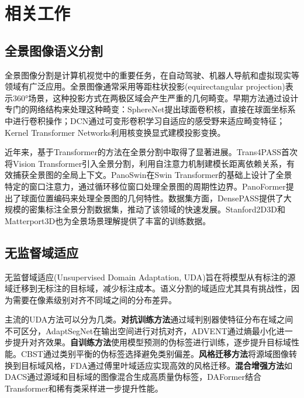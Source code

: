 \section{相关工作}

\subsection{全景图像语义分割}

全景图像分割是计算机视觉中的重要任务，在自动驾驶、机器人导航和虚拟现实等领域有广泛应用。全景图像通常采用等距柱状投影(equirectangular projection)表示360°场景，这种投影方式在两极区域会产生严重的几何畸变\cite{su2017learning,coors2018spherenet}。早期方法通过设计专门的网络结构来处理这种畸变：SphereNet\cite{coors2018spherenet}提出球面卷积核，直接在球面坐标系中进行卷积操作；DCN\cite{dai2017deformable}通过可变形卷积学习自适应的感受野来适应畸变特征；Kernel Transformer Networks\cite{su2019kernel}利用核变换显式建模投影变换。

近年来，基于Transformer的方法在全景分割中取得了显著进展。Trans4PASS\cite{zhang2022trans4pass}首次将Vision Transformer引入全景分割，利用自注意力机制建模长距离依赖关系，有效捕获全景图的全局上下文。PanoSwin\cite{yang2023panoswin}在Swin Transformer的基础上设计了全景特定的窗口注意力，通过循环移位窗口处理全景图的周期性边界。PanoFormer\cite{zhang2021panomer}提出了球面位置编码来处理全景图的几何特性。数据集方面，DensePASS\cite{ma2021densepass}提供了大规模的密集标注全景分割数据集，推动了该领域的快速发展。Stanford2D3D\cite{armeni20163d}和Matterport3D\cite{chang2017matterport3d}也为全景场景理解提供了丰富的训练数据。

\subsection{无监督域适应}

无监督域适应(Unsupervised Domain Adaptation, UDA)旨在将模型从有标注的源域迁移到无标注的目标域，减少标注成本。语义分割的域适应尤其具有挑战性，因为需要在像素级别对齐不同域之间的分布差异\cite{hoffman2018cycada,zhang2017curriculum}。

主流的UDA方法可以分为几类。\textbf{对抗训练方法}\cite{tsai2018learning,vu2019advent}通过域判别器使特征分布在域之间不可区分，AdaptSegNet\cite{tsai2018learning}在输出空间进行对抗对齐，ADVENT\cite{vu2019advent}通过熵最小化进一步提升对齐效果。\textbf{自训练方法}\cite{zou2018unsupervised,zou2019confidence}使用模型预测的伪标签进行训练，逐步提升目标域性能。CBST\cite{zou2019confidence}通过类别平衡的伪标签选择避免类别偏差。\textbf{风格迁移方法}\cite{hoffman2018cycada,yang2020fda}将源域图像转换到目标域风格，FDA\cite{yang2020fda}通过傅里叶域适应实现高效的风格迁移。\textbf{混合增强方法}\cite{tranheden2021dacs,hoyer2022daformer}如DACS\cite{tranheden2021dacs}通过源域和目标域的图像混合生成高质量伪标签，DAFormer\cite{hoyer2022daformer}结合Transformer和稀有类采样进一步提升性能。

